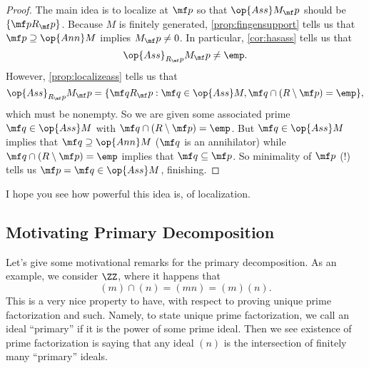 \begin{proof}
	The main idea is to localize at $\mf p$ so that $\op{Ass}M_\mf p$ should be $\{\mf pR_\mf p\}$. Because $M$ is finitely generated, \autoref{prop:fingensupport} tells us that $\mf p\supseteq\op{Ann}M$ implies $M_\mf p\ne0$. In particular, \autoref{cor:hasass} tells us that
	\[\op{Ass}_{R_\mf p}M_\mf p\ne\emp.\]
	However, \autoref{prop:localizeass} tells us that
	\[\op{Ass}_{R_\mf p}M_\mf p=\{\mf qR_\mf p:\mf q\in\op{Ass}M,\mf q\cap(R\setminus\mf p)=\emp\},\]
	which must be nonempty. So we are given some associated prime $\mf q\in\op{Ass}M$ with $\mf q\cap(R\setminus\mf p)=\emp$. But $\mf q\in\op{Ass}M$ implies that $\mf q\supseteq\op{Ann}M$ ($\mf q$ is an annihilator) while $\mf q\cap(R\setminus\mf p)=\emp$ implies that $\mf q\subseteq\mf p$. So minimality of $\mf p$ (!) tells us $\mf p=\mf q\in\op{Ass}M$, finishing.
\end{proof}
\begin{quot}
	I hope you see how powerful this idea is, of localization.
\end{quot}

\subsection{Motivating Primary Decomposition}
Let's give some motivational remarks for the primary decomposition. As an example, we consider $\ZZ$, where it happens that
\[(m)\cap(n)=(mn)=(m)(n).\]
This is a very nice property to have, with respect to proving unique prime factorization and such. Namely, to state unique prime factorization, we call an ideal ``primary'' if it is the power of some prime ideal. Then we see existence of prime factorization is saying that any ideal $(n)$ is the intersection of finitely many ``primary'' ideals.

